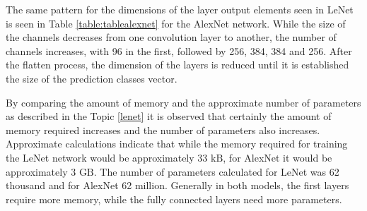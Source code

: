 The same pattern for the dimensions of the layer output elements seen in LeNet is seen in Table \ref{table:tablealexnet} for the AlexNet network. While the size of the channels decreases from one convolution layer to another, the number of channels increases, with 96 in the first, followed by 256, 384, 384 and 256. After the flatten process, the dimension of the layers is reduced until it is established the size of the prediction classes vector.

By comparing the amount of memory and the approximate number of parameters as described in the Topic \ref{lenet} it is observed that certainly the amount of memory required increases and the number of parameters also increases. Approximate calculations indicate that while the memory required for training the LeNet network would be approximately $33 \text{ kB}$, for AlexNet it would be approximately $3\text{ GB}$. The number of parameters calculated for LeNet was 62 thousand and for AlexNet 62 million.  Generally in both models, the first layers require more memory, while the fully connected layers need more parameters.

